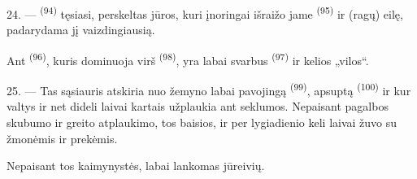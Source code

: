 \VUsaut{3.0mm}
\VUsaut{3.0mm}

24. ---  \textsuperscript{(94)} tęsiasi, perskeltas jūros, kuri
įnoringai išraižo jame  \textsuperscript{(95)} ir
 (ragų) eilę, padarydama jį vaizdingiausią.

Ant  \textsuperscript{(96)}, kuris dominuoja virš
 \textsuperscript{(98)}, yra labai svarbus 
\textsuperscript{(97)} ir kelios „vilos“.

25. --- Tas sąsiauris atskiria nuo žemyno labai pavojingą 
\textsuperscript{(99)}, apsuptą  \textsuperscript{(100)} ir
 kur valtys ir net dideli laivai kartais užplaukia ant seklumos.
Nepaisant pagalbos skubumo ir greito  atplaukimo, tos
 baisios, ir per lygiadienio  keli laivai žuvo su
žmonėmis ir prekėmis.

Nepaisant tos kaimynystės,  labai lankomas jūreivių.

\VUsaut{6.0mm}
\VUfilet{22mm}
